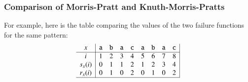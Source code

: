%
\begin{frame}
\frametitle{Comparison of Morris-Pratt and Knuth-Morris-Pratts}

For example, here is the table comparing the values of the two failure
functions for the same pattern:
\[
\begin{array}{c|cccccccc|}
 x & \texttt{a} & \texttt{b} & \texttt{a} & \texttt{c}
 & \texttt{a} & \texttt{b} & \texttt{a} & \texttt{c}\\
\hline
  i
& 1 & 2 & 3 & 4 & 5 & 6 & 7 & 8\\
  s_{x}(i)
& 0 & 1 & 1 & 2 & 1 & 2 & 3 & 4\\
  r_{x}(i)
& 0 & 1 & 0 & 2 & 0 & 1 & 0 & 2\\
\hline
\end{array}
\]

\end{frame}
